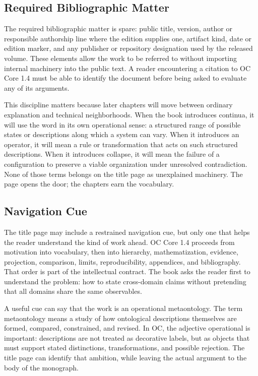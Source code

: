 \documentclass[11pt,a4paper,openany]{book}
\begin{document}
\subsection{Required Bibliographic Matter}
The required bibliographic matter is spare: public title, version, author or responsible authorship line where the edition supplies one, artifact kind, date or edition marker, and any publisher or repository designation used by the released volume. These elements allow the work to be referred to without importing internal machinery into the public text. A reader encountering a citation to OC Core 1.4 must be able to identify the document before being asked to evaluate any of its arguments. \cite{stauffer_percolation,grimmett_percolation}\par
This discipline matters because later chapters will move between ordinary explanation and technical neighborhoods. When the book introduces continua, it will use the word in its own operational sense: a structured range of possible states or descriptions along which a system can vary. When it introduces an operator, it will mean a rule or transformation that acts on such structured descriptions. When it introduces collapse, it will mean the failure of a configuration to preserve a viable organization under unresolved contradiction. None of those terms belongs on the title page as unexplained machinery. The page opens the door; the chapters earn the vocabulary.\par
\subsection{Navigation Cue}
The title page may include a restrained navigation cue, but only one that helps the reader understand the kind of work ahead. OC Core 1.4 proceeds from motivation into vocabulary, then into hierarchy, mathematization, evidence, projection, comparison, limits, reproducibility, appendices, and bibliography. That order is part of the intellectual contract. The book asks the reader first to understand the problem: how to state cross-domain claims without pretending that all domains share the same observables. \cite{stauffer_percolation,grimmett_percolation}\par
A useful cue can say that the work is an operational metaontology. The term metaontology means a study of how ontological descriptions themselves are formed, compared, constrained, and revised. In OC, the adjective operational is important: descriptions are not treated as decorative labels, but as objects that must support stated distinctions, transformations, and possible rejection. The title page can identify that ambition, while leaving the actual argument to the body of the monograph.\par
\end{document}
